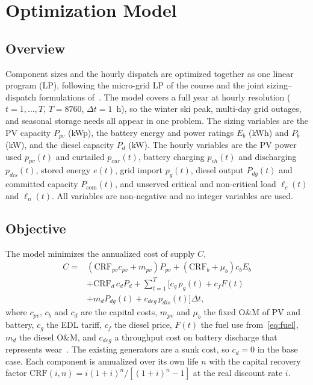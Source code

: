 \section{Optimization Model}
\label{sec:model}

\subsection{Overview}
Component sizes and the hourly dispatch are optimized together as one linear program (LP), following
the micro-grid LP of the course and the joint sizing--dispatch formulations
of~\cite{chedid2020,leon2023}. The model covers a full year at hourly resolution
($t=1,\dots,T$, $T=8760$, $\Delta t=1$~h), so the winter ski peak, multi-day grid outages, and seasonal
storage needs all appear in one problem. The sizing variables are the PV capacity $P_{pv}$ (kWp), the
battery energy and power ratings $E_b$ (kWh) and $P_b$ (kW), and the diesel capacity $P_d$ (kW). The
hourly variables are the PV power used $p_{pv}(t)$ and curtailed $p_{cur}(t)$, battery charging
$p_{ch}(t)$ and discharging $p_{dis}(t)$, stored energy $e(t)$, grid import $p_g(t)$, diesel output
$P_{dg}(t)$ and committed capacity $P_{\mathrm{com}}(t)$, and unserved critical and non-critical load
$\ell_c(t)$ and $\ell_n(t)$. All variables are non-negative and no integer variables are used.

\subsection{Objective}
The model minimizes the annualized cost of supply $C$,
\begin{equation}
\begin{split}
C = {} & \left(\mathrm{CRF}_{pv}c_{pv} + m_{pv}\right) P_{pv}
 + \left(\mathrm{CRF}_{b} + \mu_b\right) c_b E_b \\
 & + \mathrm{CRF}_{d}\,c_d P_d + \sum_{t=1}^{T} \big[ c_g\, p_g(t) + c_f F(t) \\
 & + m_{d} P_{dg}(t) + c_{deg}\, p_{dis}(t) \big]\Delta t,
\end{split}
\label{eq:obj}
\end{equation}
where $c_{pv}$, $c_b$ and $c_d$ are the capital costs, $m_{pv}$ and $\mu_b$ the fixed O\&M of PV and
battery, $c_g$ the EDL tariff, $c_f$ the diesel price, $F(t)$ the fuel use from~\eqref{eq:fuel},
$m_d$ the diesel O\&M, and $c_{deg}$ a throughput cost on battery discharge that represents
wear~\cite{seger2023}. The existing generators are a sunk cost, so $c_d=0$ in the base case. Each
component is annualized over its own life $n$ with the capital recovery factor
$\mathrm{CRF}(i,n) = i(1+i)^n/[(1+i)^n-1]$ at the real discount rate $i$.

